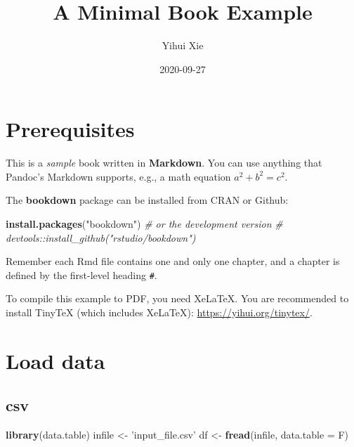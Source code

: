 \documentclass[
]{book}
\title{A Minimal Book Example}
\author{Yihui Xie}
\date{2020-09-27}
\newenvironment{Shaded}{\begin{snugshade}}{\end{snugshade}}
\newcommand{\CommentTok}[1]{\textcolor[rgb]{0.56,0.35,0.01}{\textit{#1}}}
\newcommand{\DataTypeTok}[1]{\textcolor[rgb]{0.13,0.29,0.53}{#1}}
\newcommand{\KeywordTok}[1]{\textcolor[rgb]{0.13,0.29,0.53}{\textbf{#1}}}
\newcommand{\NormalTok}[1]{#1}
\newcommand{\StringTok}[1]{\textcolor[rgb]{0.31,0.60,0.02}{#1}}
\begin{document}
\maketitle

{
\setcounter{tocdepth}{1}
\tableofcontents
}
\hypertarget{prerequisites}{%
\chapter{Prerequisites}\label{prerequisites}}

This is a \emph{sample} book written in \textbf{Markdown}. You can use anything that Pandoc's Markdown supports, e.g., a math equation \(a^2 + b^2 = c^2\).

The \textbf{bookdown} package can be installed from CRAN or Github:

\begin{Shaded}
\begin{Highlighting}[]
\KeywordTok{install.packages}\NormalTok{(}\StringTok{"bookdown"}\NormalTok{)}
\CommentTok{# or the development version}
\CommentTok{# devtools::install_github("rstudio/bookdown")}
\end{Highlighting}
\end{Shaded}

Remember each Rmd file contains one and only one chapter, and a chapter is defined by the first-level heading \texttt{\#}.

To compile this example to PDF, you need XeLaTeX. You are recommended to install TinyTeX (which includes XeLaTeX): \url{https://yihui.org/tinytex/}.

\hypertarget{load-data}{%
\chapter{Load data}\label{load-data}}

\hypertarget{csv}{%
\section{csv}\label{csv}}

\begin{Shaded}
\begin{Highlighting}[]
\KeywordTok{library}\NormalTok{(data.table)}
\NormalTok{infile <-}\StringTok{ 'input_file.csv'}
\NormalTok{df <-}\StringTok{ }\KeywordTok{fread}\NormalTok{(infile, }\DataTypeTok{data.table =}\NormalTok{ F)}
\end{Highlighting}
\end{Shaded}
\end{document}
